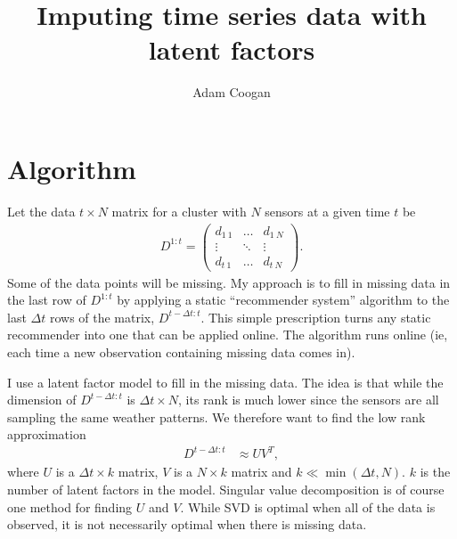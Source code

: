 \documentclass[12pt]{article}
\begin{document}
 
 
\title{Imputing time series data with latent factors}
\author{Adam Coogan}
\maketitle

\section{Algorithm}

Let the data $t \times N$ matrix for a cluster with $N$ sensors at a given time $t$ be
\begin{align*}
    D^{1:t} = \begin{pmatrix}
        d_{1\ 1} & \dots & d_{1\ N}\\
        \vdots & \ddots & \vdots\\
        d_{t\ 1} & \dots & d_{t\ N}
    \end{pmatrix}.
\end{align*}
Some of the data points will be missing.  My approach is to fill in missing data in the last row of $D^{1:t}$ by applying a static ``recommender system'' algorithm to the last $\Delta t$ rows of the matrix, $D^{t-\Delta t:t}$. This simple prescription turns any static recommender into one that can be applied online. The algorithm runs online (ie, each time a new observation containing missing data comes in).

I use a latent factor model to fill in the missing data. The idea is that while the dimension of $D^{t-\Delta t:t}$ is $\Delta t \times N$, its rank is much lower since the sensors are all sampling the same weather patterns. We therefore want to find the low rank approximation
\begin{align*}
    D^{t-\Delta t:t} &\approx U V^T,
\end{align*}
where $U$ is a $\Delta t \times k$ matrix, $V$ is a $N \times k$ matrix and $k \ll \min(\Delta t, N)$. $k$ is the number of latent factors in the model. Singular value decomposition is of course one method for finding $U$ and $V$. While SVD is optimal when all of the data is observed, it is not necessarily optimal when there is missing data.
\end{document}
